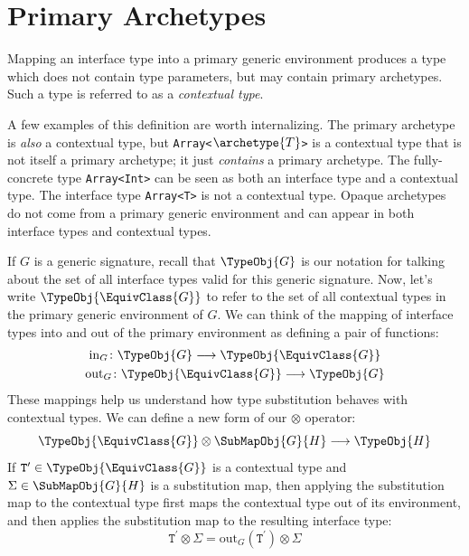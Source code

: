 \documentclass[../generics]{subfiles}
\begin{document}
\section{Primary Archetypes}\label{archetypesubst}

Mapping an interface type into a primary generic environment produces a type which does not contain type parameters, but may contain primary archetypes. Such a type is referred to as a \emph{contextual type}. 

A few examples of this definition are worth internalizing. The primary archetype  is \emph{also} a contextual type, but \texttt{Array<$\archetype{T}$>} is a contextual type that is not itself a primary archetype; it just \emph{contains} a primary archetype. The fully-concrete type \texttt{Array<Int>} can be seen as both an interface type and a contextual type. The interface type \texttt{Array<T>} is not a contextual type. Opaque archetypes do not come from a primary generic environment and can appear in both interface types and contextual types.

If $G$ is a generic signature, recall that $\TypeObj{G}$ is our notation for talking about the set of all interface types valid for this generic signature. Now, let's write $\TypeObj{\EquivClass{G}}$ to refer to the set of all contextual types in the primary generic environment of $G$. We can think of the mapping of interface types into and out of the primary environment as defining a pair of functions:
\begin{gather*}
\mathrm{in}_G\colon\TypeObj{G}\longrightarrow\TypeObj{\EquivClass{G}}\\
\mathrm{out}_G\colon\TypeObj{\EquivClass{G}}\longrightarrow\TypeObj{G}
\end{gather*}
These mappings help us understand how type substitution behaves with contextual types. We can define a new form of our $\otimes$ operator:
\[\TypeObj{\EquivClass{G}}\otimes\SubMapObj{G}{H}\longrightarrow\TypeObj{H}\]
If $\texttt{T}^\prime\in\TypeObj{\EquivClass{G}}$ is a contextual type and $\Sigma\in \SubMapObj{G}{H}$ is a substitution map, then applying the substitution map to the contextual type first maps the contextual type out of its environment, and then applies the substitution map to the resulting interface type:
\[\texttt{T}^\prime\otimes \Sigma = \mathrm{out}_G(\texttt{T}^\prime)\otimes \Sigma\]
\end{document}
